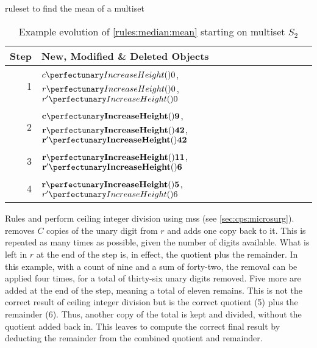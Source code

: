 \begin{cprulesetfloat}
\begin{cpruleset}




\end{cpruleset}
\caption{\label{rules:median:mean}\Gls{ruleset} to find the mean of a multiset}
\end{cprulesetfloat}

\begin{table}[htbp]
\centering
  \begin{tabular}{|r|l|}
    \hline
    \textbf{Step} & \textbf{New, Modified \& Deleted Objects} \\ \hline
    1 & \(\cpfunc{c}{0}\), \(\cpfunc{r}{0}\), \(\cpfunc{r'}{0}\)\\ \hline
    2 & \(\mathbf{\cpfunc{c}{9}}\), \(\mathbf{\cpfunc{r}{42}}\), \(\mathbf{\cpfunc{r'}{42}}\)\\ \hline
    3 & \(\mathbf{\cpfunc{r}{11}}\), \(\mathbf{\cpfunc{r'}{6}}\)\\ \hline
    4 & \(\mathbf{\cpfunc{r}{5}}\), \sout{\(\cpfunc{r'}{6}\)}\\ \hline

\end{tabular}
\caption[Example evolution of \cref{rules:median:mean} to find the mean of multiset]{\label{tab:median:mean}Example evolution of \cref{rules:median:mean} starting on multiset \(S_2\)}
\end{table}

Rules  and  perform ceiling integer division using \glspl{ms} (see \vref{sec:cps:microsurg}).   removes \(C\) copies of the unary digit from \(r\) and adds one copy back to it.  This is repeated as many times as possible, given the number of digits available.  What is left in \(r\) at the end of the step is, in effect, the quotient plus the remainder.  In this example, with a count of nine and a sum of forty-two, the removal can be applied four times, for a total of thirty-six unary digits removed.  Five more are added at the end of the step, meaning a total of eleven remains.  This is not the correct result of ceiling integer division but is the correct quotient (5) plus the remainder (6).  Thus, another copy of the total is kept and divided, without the quotient added back in.  This leaves  to compute the correct final result by deducting the remainder from the combined quotient and remainder.


